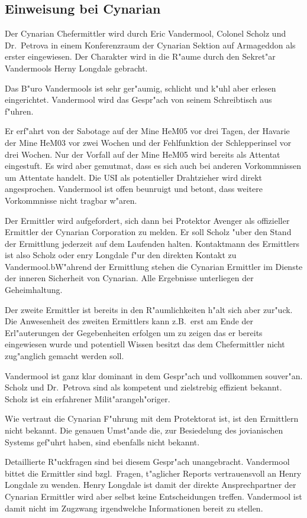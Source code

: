 \subsection{Einweisung bei Cynarian}

Der Cynarian Chefermittler wird durch Eric Vandermool, Colonel Scholz und Dr.~Petrova in einem Konferenzraum der Cynarian Sektion auf Armageddon als erster eingewiesen. Der Charakter wird in die R"aume durch den Sekret"ar Vandermools Herny Longdale gebracht.

Das B"uro Vandermools ist sehr ger"aumig, schlicht und k"uhl aber erlesen eingerichtet. Vandermool wird das Gespr"ach von seinem Schreibtisch aus f"uhren.

Er erf"ahrt von der Sabotage auf der Mine HeM05 vor drei Tagen, der Havarie der Mine HeM03 vor zwei Wochen und der Fehlfunktion der Schlepperinsel vor drei Wochen. Nur der Vorfall auf der Mine HeM05 wird bereits als Attentat eingestuft. Es wird aber gemutma\3t, dass es sich auch bei anderen Vorkommnissen um Attentate handelt. Die USI als potentieller Drahtzieher wird direkt angesprochen. Vandermool ist offen beunruigt und betont, dass weitere Vorkommnisse nicht tragbar w"aren.

Der Ermittler wird aufgefordert, sich dann bei Protektor Avenger als offizieller Ermittler der Cynarian Corporation zu melden. Er soll Scholz "uber den Stand der Ermittlung jederzeit auf dem Laufenden halten. Kontaktmann des Ermittlers ist also Scholz oder enry Longdale f"ur den direkten Kontakt zu Vandermool.bW"ahrend der Ermittlung stehen die Cynarian Ermittler im Dienste der inneren Sicherheit von Cynarian. Alle Ergebnisse unterliegen der Geheimhaltung.

\begin{remarks}
	Der zweite Ermittler ist bereits in den R"aumlichkeiten h"alt sich aber zur"uck. Die Anwesenheit des zweiten Ermittlers kann z.B.~erst am Ende der Erl"auterungen der Gegebenheiten erfolgen um zu zeigen das er bereits eingewiesen wurde und potentiell Wissen besitzt das dem Chefermittler nicht zug"anglich gemacht werden soll.
	
	Vandermool ist ganz klar dominant in dem Gespr"ach und vollkommen souver"an. Scholz und Dr.~Petrova sind als kompetent und zielstrebig effizient bekannt. Scholz ist ein erfahrener Milit"arangeh"origer.
	
	Wie vertraut die Cynarian F"uhrung mit dem Protektorat ist, ist den Ermittlern nicht bekannt. Die genauen Umst"ande die, zur Besiedelung des jovianischen Systems gef"uhrt haben, sind ebenfalls nicht bekannt.
	
	Detaillierte R"uckfragen sind bei diesem Gespr"ach unangebracht. Vandermool bittet die Ermittler sind bzgl.~Fragen, t"aglicher Reports vertrauensvoll an Henry Longdale zu wenden. Henry Longdale ist damit der direkte Ansprechpartner der Cynarian Ermittler wird aber selbst keine Entscheidungen treffen. Vandermool ist damit nicht im Zugzwang irgendwelche Informationen bereit zu stellen.
\end{remarks}

